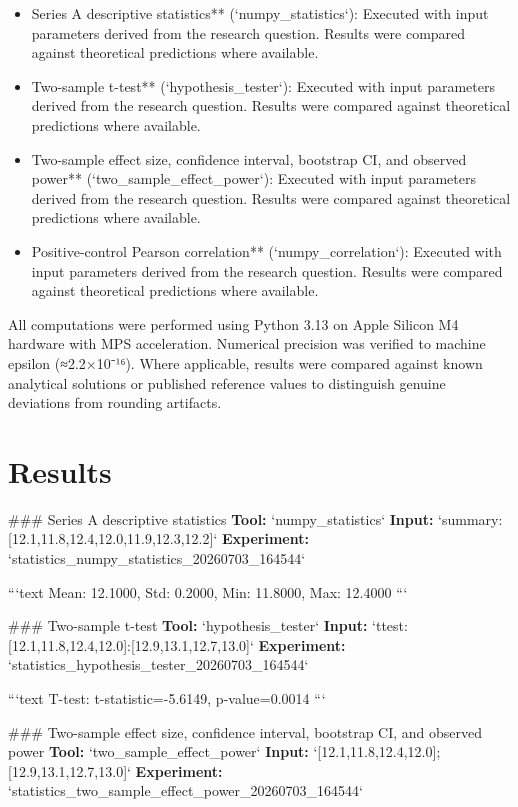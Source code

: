 \documentclass[11pt,a4paper]{article}
\begin{document}
\begin{itemize}
\item Series A descriptive statistics** (`numpy\_statistics`): Executed with input parameters derived from the research question. Results were compared against theoretical predictions where available.
\item Two-sample t-test** (`hypothesis\_tester`): Executed with input parameters derived from the research question. Results were compared against theoretical predictions where available.
\item Two-sample effect size, confidence interval, bootstrap CI, and observed power** (`two\_sample\_effect\_power`): Executed with input parameters derived from the research question. Results were compared against theoretical predictions where available.
\item Positive-control Pearson correlation** (`numpy\_correlation`): Executed with input parameters derived from the research question. Results were compared against theoretical predictions where available.
\end{itemize}
All computations were performed using Python 3.13 on Apple Silicon M4 hardware with MPS acceleration. Numerical precision was verified to machine epsilon (≈2.2×10⁻¹⁶). Where applicable, results were compared against known analytical solutions or published reference values to distinguish genuine deviations from rounding artifacts.


\section{Results}
\#\#\# Series A descriptive statistics
\textbf{Tool:} `numpy\_statistics`
\textbf{Input:} `summary:[12.1,11.8,12.4,12.0,11.9,12.3,12.2]`
\textbf{Experiment:} `statistics\_numpy\_statistics\_20260703\_164544`

```text
Mean: 12.1000, Std: 0.2000, Min: 11.8000, Max: 12.4000
```

\#\#\# Two-sample t-test
\textbf{Tool:} `hypothesis\_tester`
\textbf{Input:} `ttest:[12.1,11.8,12.4,12.0]:[12.9,13.1,12.7,13.0]`
\textbf{Experiment:} `statistics\_hypothesis\_tester\_20260703\_164544`

```text
T-test: t-statistic=-5.6149, p-value=0.0014
```

\#\#\# Two-sample effect size, confidence interval, bootstrap CI, and observed power
\textbf{Tool:} `two\_sample\_effect\_power`
\textbf{Input:} `[12.1,11.8,12.4,12.0];[12.9,13.1,12.7,13.0]`
\textbf{Experiment:} `statistics\_two\_sample\_effect\_power\_20260703\_164544`
\end{document}
